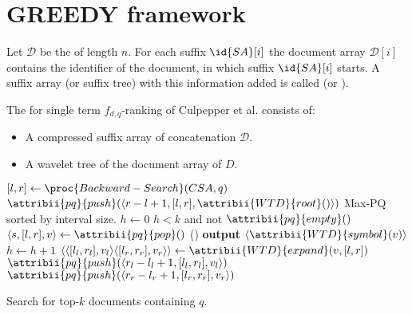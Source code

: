 \section{GREEDY framework}

\begin{Definition}
  Let $\mathcal{D}$ be the  of length $n$. For each suffix $\id{SA}[i]$ the document array $\mathcal{D}[i]$ contains the identifier of the document, in which suffix $\id{SA}[i]$ starts. A suffix array (or suffix tree) with this information added is called  (or ).
\end{Definition}

\begin{Definition}
  The  for single term $f_{d,q}$-ranking of Culpepper et al. \cite{Culpepper2010} consists of:
  \begin{itemize}
    \item A compressed suffix array  of concatenation $\mathcal{D}$.
    \item A wavelet tree  of the document array of $D$.
  \end{itemize}
\end{Definition}

\begin{algorithm}[htb]
  \begin{codebox}
    \li $[l,r] \gets \proc{Backward-Search}(CSA, q)$
    \li $\attribii{pq}{push}(\langle r - l + 1, [l,r], \attribii{WTD}{root}()\rangle)$ \>\>\>\>\>\>\>\>\Comment Max-PQ sorted by interval size.
    \li $h \gets 0$
    \li \While $h < k$ and not $\attribii{pq}{empty}()$
        \Do
    \li   $\langle s, [l,r], v \rangle \gets \attribii{pq}{pop}()$
    \li   \If {}()
          \Then
    \li     \textbf{output} $\langle \attribii{WTD}{symbol}(v) \rangle$
    \li     $h \gets h + 1$
    \li   \Else
    \li     $\langle \langle [l_l, r_l], v_l \rangle \langle [l_r, r_r], v_r \rangle \rangle \gets \attribii{WTD}{expand}(v, [l,r])$
    \li     $\attribii{pq}{push}(\langle r_l - l_l + 1, [l_l, r_l], v_l \rangle)$
    \li     $\attribii{pq}{push}(\langle r_r - l_r + 1, [l_r, r_r], v_r \rangle)$
          \End
        \End
  \end{codebox}
  \caption{Search for top-$k$ documents containing $q$.}
  \label{alg:greedyRankedSearch}
\end{algorithm}
